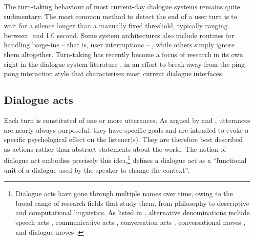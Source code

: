 The turn-taking behaviour of most current-day dialogue systems remains quite rudimentary.  The most common method to detect the end of a user turn is to wait for a silence longer than a manually fixed threshold, typically ranging between 
\textonehalf  $ $ and 1.0 second.  Some system architectures also include routines for handling barge-ins -- that is, user interruptions --  \citep{StromS00}, while others simply ignore them altogether. Turn-taking has recently become a focus of research in its own right in the dialogue system literature \citep{RauxE09,Gravano2011}, in an effort to break away from the ping-pong interaction style that characterises most current dialogue interfaces.  

\subsection{Dialogue acts}

Each turn is constituted of one or more utterances.  As argued by \cite{Austin1962} and \cite{Searle1969}, utterances are nearly always purposeful: they have specific goals and are intended to evoke a specific psychological effect on the listener(s).  They are therefore best described as actions rather than abstract statements about the world.  The notion of dialogue act embodies precisely this idea.\footnote{Dialogue acts have gone through multiple names over time, owing to the broad range of research fields that study them, from philosophy to descriptive and computational linguistics.  As listed in \cite{mctear2004}, alternative denominations include speech acts \citep{Searle1969}, communicative acts \citep{allwood1976}, conversation acts \citep{TraumH92}, conversational moves \citep{sinclair1975}, and dialogue moves \citep{LarssonCEL99}.} \cite{Bunt1996} defines a dialogue act as a ``functional unit of a dialogue used by the speaker to change the context''.

